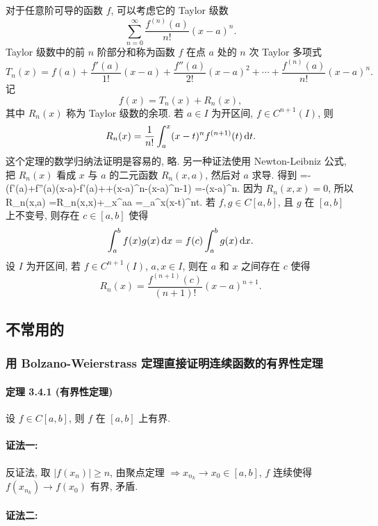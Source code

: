 对于任意阶可导的函数 $f$, 可以考虑它的 Taylor 级数
\[
\sum_{n=0}^{\infty}\frac{f^{(n)}(a)}{n!}(x-a)^{n}.
\]
Taylor 级数中的前 $n$ 阶部分和称为函数 $f$ 在点 $a$ 处的 $n$ 次 Taylor 多项式
\[
T_{n}(x)=f(a)+\frac{f'(a)}{1!}(x-a)+\frac{f''(a)}{2!}(x-a)^{2}+\cdots+\frac{f^{(n)}(a)}{n!}(x-a)^{n}.
\]
记
\[
f(x)=T_{n}(x)+R_{n}(x),
\]
其中 $R_{n}(x)$ 称为 Taylor 级数的余项.
	若 $a\in I$ 为开区间, $f\in C^{n+1}(I)$, 则
	\[
	R_{n}(x)=\frac{1}{n!}\int_{a}^{x}(x-t)^{n}f^{(n+1)}(t)\,\mathrm{d} t.
	\]
\et
\ba
这个定理的数学归纳法证明是容易的, 略. 
另一种证法使用 Newton-Leibniz 公式, 把 $R_n(x)$ 看成 $x$ 与 $a$ 的二元函数 $R_n(x,a)$, 然后对 $a$ 求导. 得到
\bee
{}
	=-\left(f'(a)+f''(a)(x-a)-f'(a)+\cdots+(x-a)^n-(x-a)^{n-1}\right)
	=-(x-a)^n.
\eee
因为 $R_n(x,x)=0$, 所以
\bee
R_n(x,a)
	=R_n(x,x)+\int_{x}^{a}\ud a
	=\int_{a}^{x}(x-t)^n\ud t.
\eee
\ea
{}
	若 $f,g\in C[a,b]$, 且 $g$ 在 $[a,b]$ 上不变号,
	则存在 $c\in[a,b]$ 使得
	\[
	\int_{a}^{b}f(x)g(x)\,\mathrm{d} x=f(c)\int_{a}^{b}g(x)\,\mathrm{d} x.
	\]
\et
%
	设 $I$ 为开区间, 若 $f\in C^{n+1}(I)$, $a,x\in I$, 则在 $a$ 和 $x$ 之间存在 $c$ 使得
	\[
	R_{n}(x)=\frac{f^{(n+1)}(c)}{(n+1)!}(x-a)^{n+1}.
	\]
\et

\subsection{不常用的}

\subsubsection{用 Bolzano-Weierstrass 定理直接证明连续函数的有界性定理}
\paragraph{定理 3.4.1 (有界性定理)}

设 $f\in C[a,b]$, 则 $f$ 在 $[a,b]$ 上有界.

\paragraph{证法一:}

反证法, 取 $\left|f(x_{n})\right|\ge n$, 由聚点定理 $\Longrightarrow x_{n_{k}}\to x_{0}\in[a,b]$,
$f$ 连续使得 $f(x_{n_{k}})\to f(x_{0})$ 有界, 矛盾.

\paragraph{证法二:}

